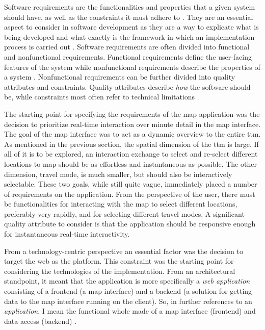 
Software requirements are the functionalities and properties
that a given system should have,
as well as the constraints it must adhere to \parencite{chu2009}.
They are an essential aspect to consider in software development
as they are a way to explicate
what is being developed and what exactly is the framework
in which an implementation process is carried out \parencite{saq2020}.
Software requirements are often divided into
functional and nonfunctional requirements.
Functional requirements define the user-facing features of the system
while nonfunctional requirements describe the properties of a system
\parencite{chu2009}.
Nonfunctional requirements can be further divided into
quality attributes and constraints.
Quality attributes describe \textit{how} the software should be,
while constraints most often refer to technical limitations \parencite{chu2009}.

The starting point for specifying the requirements of the map application
was the decision to prioritize real-time interaction over minute detail in the map interface.
The goal of the map interface was to act as a dynamic overview to the entire \acrshort{ttm}.
As mentioned in the previous section,
the spatial dimension of the \acrshort{ttm} is large.
If all of it is to be explored,
an interaction exchange to select and re-select different locations to map
should be as effortless and instantaneous as possible.
The other dimension, travel mode, is much smaller,
but should also be interactively selectable.
These two goals, while still quite vague,
immediately placed a number of requirements on the application.
From the perspective of the user,
there must be functionalities for interacting with the map to
select different locations, preferably very rapidly,
and for selecting different travel modes.
A significant quality attribute to consider is that the application should
be responsive enough for instantaneous real-time interactivity.

From a technology-centric perspective an essential factor was
the decision to target the web as the platform.
This constraint was the starting point for considering the technologies
of the implementation.
From an architectural standpoint,
it meant that the application is more specifically a \textit{web application}
consisting of a frontend (a map interface) and a backend
(a solution for getting data to the map interface running on the client).
So, in further references to an \textit{application},
I mean the functional whole made of a map interface (frontend) and data access (backend)
.

